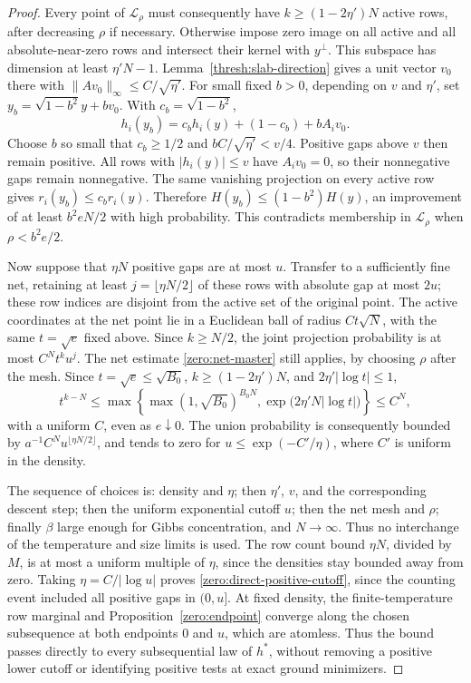 \documentclass[11pt,a4paper]{article}
\numberwithin{equation}{section}
\theoremstyle{definition}
\theoremstyle{remark}
\begin{document}
\begin{proof}
Every point of \(\mathcal L_\rho\) must consequently have
\(k\ge(1-2\eta')N\) active rows, after decreasing \(\rho\) if
necessary.  Otherwise impose zero image on all active and all
absolute-near-zero rows and intersect their kernel with \(y^\perp\).
This subspace has dimension at least \(\eta'N-1\).
Lemma~\ref{thresh:slab-direction} gives a unit
vector \(v_0\) there with \(\|Av_0\|_\infty\le C/\sqrt{\eta'}\).
For small fixed \(b>0\), depending on \(v\) and \(\eta'\), set
\(y_b=\sqrt{1-b^2}y+bv_0\).  With $c_b=\sqrt{1-b^2}$,
\[
 h_i(y_b)=c_b h_i(y)+(1-c_b)+bA_i v_0.
\]
Choose $b$ so small that $c_b\ge1/2$ and
$bC/\sqrt{\eta'}<v/4$.  Positive gaps above $v$ then remain
positive.  All rows with $|h_i(y)|\le v$ have $A_i v_0=0$, so
their nonnegative gaps remain nonnegative.  The same vanishing
projection on every active row gives
$r_i(y_b)\le c_b r_i(y)$.  Therefore
\(H(y_b)\le(1-b^2)H(y)\), an improvement of at least
\(b^2 eN/2\) with high probability.  This contradicts membership
in \(\mathcal L_\rho\) when \(\rho<b^2e/2\).

Now suppose that \(\eta N\) positive gaps are at most \(u\).
Transfer to a sufficiently fine net, retaining at least
\(j=\lfloor\eta N/2\rfloor\) of these rows with absolute gap at
most \(2u\); these row indices are disjoint from the active set of
the original point.  The active coordinates at the net point lie
in a Euclidean ball of radius \(Ct\sqrt N\), with the same
$t=\sqrt e$ fixed above.  Since \(k\ge N/2\), the joint
projection probability is at most \(C^N t^k u^j\).
The net estimate \eqref{zero:net-master} still applies, by choosing
\(\rho\) after the mesh.  Since $t=\sqrt e\le\sqrt{B_0}$,
$k\ge(1-2\eta')N$, and $2\eta'|\log t|\le1$,
\[
 t^{k-N}\le
 \max\left\{\max(1,\sqrt{B_0})^{B_0N},
               \exp\bigl(2\eta'N|\log t|\bigr)\right\}
 \le C^N,
\]
with a uniform $C$, even as $e\downarrow0$.
The union probability is consequently bounded by
\(a^{-1}C^N u^{\lfloor\eta N/2\rfloor}\), and tends to zero for
\(u\le\exp(-C'/\eta)\), where \(C'\) is uniform in the density.

The sequence of choices is: density and \(\eta\); then \(\eta'\),
\(v\), and the corresponding descent step; then the uniform
exponential cutoff \(u\); then the net mesh and \(\rho\); finally
\(\beta\) large enough for Gibbs concentration, and \(N\to\infty\).
Thus no interchange of the temperature and size limits is used.
The row count bound \(\eta N\), divided by \(M\), is at most a
uniform multiple of \(\eta\), since the densities stay bounded away
from zero.  Taking \(\eta=C/|\log u|\) proves
\eqref{zero:direct-positive-cutoff}, since the counting event included
all positive gaps in \((0,u]\).  At fixed density, the finite-temperature
row marginal and Proposition~\ref{zero:endpoint} converge along the
chosen subsequence at both endpoints 0 and \(u\), which are atomless.
Thus the bound passes directly to every subsequential law of
\(h^*\), without removing a positive lower cutoff or identifying
positive tests at exact ground minimizers.
\end{proof}
\end{document}
